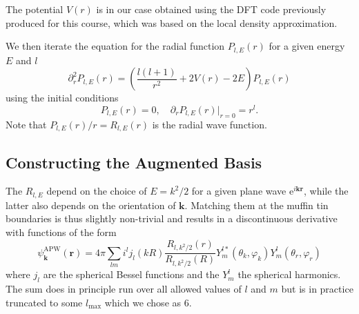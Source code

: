 \documentclass[a4paper,DIV=12,english]{scrartcl}
\begin{document}
The potential $V(r)$ is in our case obtained using the DFT code previously produced for this course, which was based on the local density approximation.

We then iterate the equation for the radial function $P_{l,E}(r)$ for a given energy $E$ and $l$
\begin{equation}
    \partial_r^2 P_{l,E}(r) = \left(\frac{l(l+1)}{r^2} + 2V(r) - 2E\right)P_{l,E}(r)
\end{equation}
using the initial conditions
\begin{equation}
    P_{l,E}(r) = 0, \quad \partial_r P_{l,E}(r)|_{r=0} = r^l.
\end{equation}
Note that $P_{l,E}(r)/r = R_{l,E}(r)$ is the radial wave function.

\subsection{Constructing the Augmented Basis}
The $R_{l,E}$ depend on the choice of $E=k^2/2$ for a given plane wave $\text{e}^{i\textbf{k}\textbf{r}}$, while the latter also depends on the orientation of $\textbf{k}$. Matching them at the muffin tin boundaries is thus slightly non-trivial and results in a discontinuous derivative with functions of the form~\cite{Thijssen2007cp} 
\begin{equation}
    \psi^{\text{APW}}_\textbf{k} (\textbf{r}) = 4\pi \sum_{lm}i^l j_l(kR)\frac{R_{l,k^2/2}(r)}{R_{l,k^2/2}(R)} Y^{l*}_m (\theta_k, \varphi_k)
    Y^{l}_m (\theta_r, \varphi_r)
\end{equation}
where $j_l$ are the spherical Bessel functions and the $Y^l_m$ the spherical harmonics. The sum does in principle run over all allowed values of $l$ and $m$ but is in practice truncated to some $l_\text{max}$ which we chose as 6.
\end{document}
